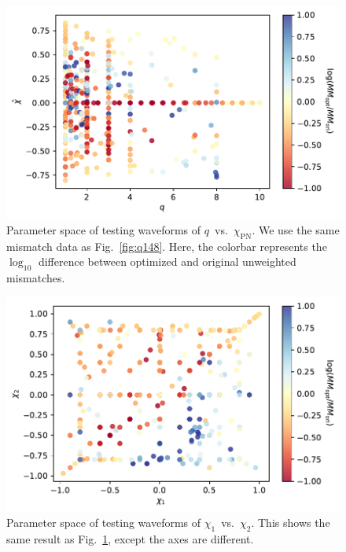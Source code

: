 \documentclass[twocolumn]{aastex631}
\begin{document}

\begin{figure}[t]
	\centering
	\includegraphics[width=\columnwidth]{../static/ps_q148_qchi.pdf}
	\caption{Parameter space of testing waveforms of $q$~vs.~$\chi_{\mathrm{PN}}$. We use the same mismatch data as Fig.~\ref{fig:q148}. Here, the colorbar represents the $\log_{10}$ difference between optimized and original unweighted mismatches.}
	\label{fig:ps_q148_qchi}
\end{figure}
\begin{figure}[t]
	\centering
	\includegraphics[width=\columnwidth]{../static/ps_q148.pdf}
	\caption{Parameter space of testing waveforms of $\chi_1$~vs.~$\chi_2$. This shows the same result as Fig.~\ref{fig:ps_q148_qchi}, except the axes are different.}
	\label{fig:ps_q148}
\end{figure}
\end{document}
